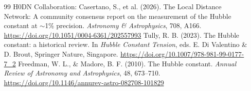 \documentclass[11pt]{article}
\begin{document}
\begin{thebibliography}{99}
H0DN Collaboration: Casertano, S., et al. (2026). The Local Distance Network: A community consensus report on the measurement of the Hubble constant at $\sim$1\% precision. \textit{Astronomy \& Astrophysics}, 708, A166. \url{https://doi.org/10.1051/0004-6361/202557993}
Tully, R. B. (2023). The Hubble constant: a historical review. In \textit{Hubble Constant Tension}, eds. E. Di Valentino \& D. Brout, Springer Nature, Singapore. \url{https://doi.org/10.1007/978-981-99-0177-7_2}
Freedman, W. L., \& Madore, B. F. (2010). The Hubble constant. \textit{Annual Review of Astronomy and Astrophysics}, 48, 673--710. \url{https://doi.org/10.1146/annurev-astro-082708-101829}
\end{thebibliography}
\end{document}
